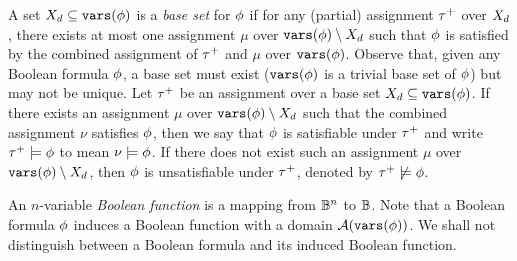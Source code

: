A set $X_d\subseteq\texttt{vars}(\phi)$ is a \textit{base set} for $\phi$ if
for any (partial) assignment $\tau^+$ over $X_d$,
there exists at most one assignment $\mu$ over $\texttt{vars}(\phi)\setminus X_d$
such that $\phi$ is satisfied by the combined assignment of $\tau^+$ and $\mu$ over $\texttt{vars}(\phi)$.
Observe that, given any Boolean formula $\phi$,
a base set must exist ($\texttt{vars}(\phi)$ is a trivial base set of $\phi$) but may not be unique.
Let $\tau^+$ be an assignment over a base set $X_d\subseteq\texttt{vars}(\phi)$.
If there exists an assignment $\mu$ over $\texttt{vars}(\phi)\setminus X_d$
such that the combined assignment $\nu$ satisfies $\phi$,
then we say that $\phi$ is satisfiable under $\tau^+$ and write $\tau^+\models\phi$ to mean $\nu\models\phi$.
If there does not exist such an assignment $\mu$ over $\texttt{vars}(\phi)\setminus X_d$,
then $\phi$ is unsatisfiable under $\tau^+$, denoted by $\tau^+\not\models\phi$.

An $n$-variable \textit{Boolean function} is a mapping from $\mathbb{B}^n$ to $\mathbb{B}$.
Note that a Boolean formula $\phi$ induces a Boolean function with a domain $\mathcal{A}(\texttt{vars}(\phi))$.
We shall not distinguish between a Boolean formula and its induced Boolean function.